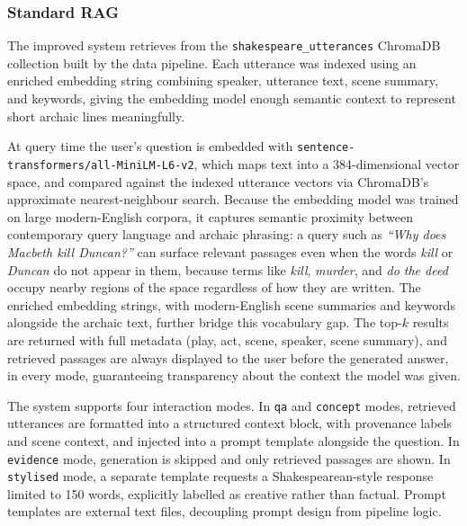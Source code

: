 \subsubsection{Standard RAG}
The improved system retrieves from the
\texttt{shakespeare\_utterances} ChromaDB collection built by the data
pipeline. Each utterance was indexed using an enriched embedding string
combining speaker, utterance text, scene summary, and keywords, giving
the embedding model enough semantic context to represent short archaic
lines meaningfully.

At query time the user's question is embedded with
\texttt{sentence-transformers/all-MiniLM-L6-v2}, which maps text into a
384-dimensional vector space, and compared against the indexed utterance
vectors via ChromaDB's approximate nearest-neighbour search. Because the
embedding model was trained on large modern-English corpora, it captures
semantic proximity between contemporary query language and archaic
phrasing: a query such as \emph{``Why does Macbeth kill Duncan?''} can
surface relevant passages even when the words \emph{kill} or \emph{Duncan}
do not appear in them, because terms like \emph{kill}, \emph{murder}, and
\emph{do the deed} occupy nearby regions of the space regardless of how
they are written. The enriched embedding strings, with modern-English
scene summaries and keywords alongside the archaic text, further bridge
this vocabulary gap. The top-$k$ results are returned with full metadata
(play, act, scene, speaker, scene summary), and retrieved passages are
always displayed to the user before the generated answer, in every mode,
guaranteeing transparency about the context the model was given.

The system supports four interaction modes. In \texttt{qa} and
\texttt{concept} modes, retrieved utterances are formatted into a
structured context block, with provenance labels and scene context, and
injected into a prompt template alongside the question. In
\texttt{evidence} mode, generation is skipped and only retrieved passages
are shown. In \texttt{stylised} mode, a separate template requests a
Shakespearean-style response limited to 150 words, explicitly labelled as
creative rather than factual. Prompt templates are external text files,
decoupling prompt design from pipeline logic.

